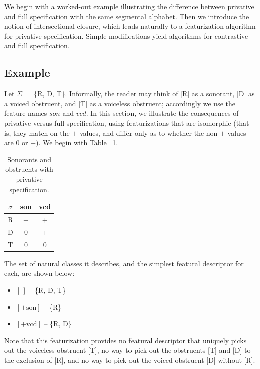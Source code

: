 \documentclass[11pt, oneside]{article}   	%
\begin{document}
We begin with a worked-out example illustrating the difference between privative and full specification with the same segmental alphabet. Then we introduce the notion of intersectional closure, which leads naturally to a featurization algorithm for privative specification. Simple modifications yield algorithms for contrastive and full specification.

\subsection{Example}

Let $\Sigma =$ \{R, D, T\}. Informally, the reader may think of [R] as a sonorant, [D] as a voiced obstruent, and [T] as a voiceless obstruent; accordingly we use the feature names $son$ and $vcd$. In this section, we illustrate the consequences of privative versus full specification, using featurizations that are isomorphic (that is, they match on the $+$ values, and differ only as to whether the non-$+$ values are $0$ or $-$). We begin with Table ~\ref{table:privative}.

\begin{table}[h]
    \centering
    \begin{tabular} {|c||c|c|}
    \hline
        $\sigma$ & son & vcd \\ \hline
        R & + & + \\
        D & 0 & + \\
        T & 0 & 0 \\
        \hline
    \end{tabular}
    \caption{Sonorants and obstruents with privative specification.}
    \label{table:privative}
\end{table}

\noindent The set of natural classes it describes, and the simplest featural descriptor for each, are shown below: \begin{itemize}
  \item $[\,]$ -- \{R, D, T\}
  \item $[+\text{son}]$ -- \{R\}
  \item $[+\text{vcd}]$ -- \{R, D\}
  \end{itemize}
  
\noindent Note that this featurization provides no featural descriptor that uniquely picks out the voiceless obstruent [T], no way to pick out the obstruents [T] and [D] to the exclusion of [R], and no way to pick out the voiced obstruent [D] without [R].
\end{document}
